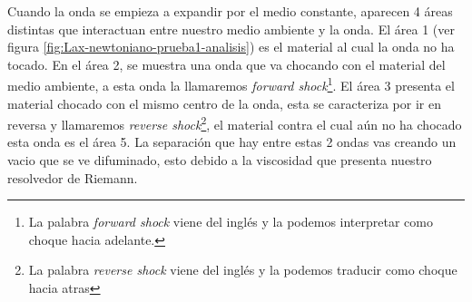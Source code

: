 \documentclass[12pt,a4paper]{book}
\begin{document}
Cuando la onda se empieza a expandir por el medio constante, aparecen 4 áreas distintas que interactuan entre nuestro medio ambiente y la onda. El área 1 (ver figura \ref{fig:Lax-newtoniano-prueba1-analisis}) es el material al cual la onda no ha tocado. En el área 2, se muestra una onda que va chocando con el material del medio ambiente, a esta onda la llamaremos \emph{forward shock}\footnote{La palabra \emph{forward shock} viene del inglés y la podemos interpretar como choque hacia adelante. }. El área 3 presenta el material chocado con el mismo centro de la onda, esta se caracteriza por ir en reversa y llamaremos \emph{reverse shock}\footnote{La palabra \emph{reverse shock} viene del inglés y la podemos traducir como choque hacia atras}, el material contra el cual aún no ha chocado esta onda es el área 5. La separación que hay entre estas 2 ondas vas creando un vacio que se ve difuminado, esto debido a la viscosidad que presenta nuestro resolvedor de Riemann.
\end{document}
